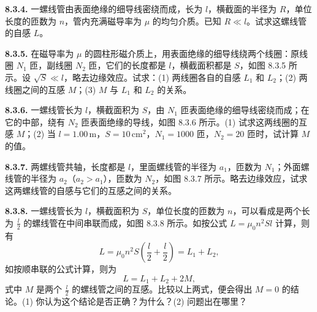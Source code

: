 \vfill
\newpage

\textbf{8.3.4.} 一螺线管由表面绝缘的细导线密绕而成，长为 $l$，横截面的半径为 $R$，单位长度的匝数为 $n$，管内充满磁导率为 $\mu$ 的均匀介质。已知 $R \ll l$。试求这螺线管的自感 $L$。

\begin{center}
\end{center}

\vfill
\newpage

\textbf{8.3.5.} 在磁导率为 $\mu$ 的圆柱形磁介质上，用表面绝缘的细导线绕两个线圈：原线圈 $N_{1}$ 匝，副线圈 $N_{2}$ 匝，它们的长度都是 $l$，横截面积都是 $S$，如图 8.3.5 所示。设 $\sqrt{S} \ll l$，略去边缘效应。试求：(1) 两线圈各自的自感 $L_{1}$ 和 $L_{2}$；(2) 两线圈之间的互感 $M$；(3) $M$ 与 $L_{1}$ 和 $L_{2}$ 的关系。

\begin{center}
\end{center}

\vfill
\newpage

\textbf{8.3.6.} 一螺线管长为 $l$，横截面积为 $S$，由 $N_{1}$ 匝表面绝缘的细导线密绕而成；在它的中部，绕有 $N_{2}$ 匝表面绝缘的导线，如图 8.3.6 所示。(1) 试求这两线圈的互感 $M$；(2) 当 $l = 1.00\,\mathrm{m}$，$S = 10\,\mathrm{cm}^{2}$，$N_{1} = 1000$ 匝，$N_{2} = 20$ 匝时，试计算 $M$ 的值。

\begin{center}
\end{center}

\vfill
\newpage

\textbf{8.3.7.} 两螺线管共轴，长度都是 $l$，里面螺线管的半径为 $a_1$，匝数为 $N_1$；外面螺线管的半径为 $a_2$（$a_2 > a_1$），匝数为 $N_2$，如图 8.3.7 所示。略去边缘效应，试求这两螺线管的自感与它们的互感之间的关系。

\begin{center}
\end{center}

\vfill
\newpage

\textbf{8.3.8.} 一螺线管长为 $l$，横截面积为 $S$，单位长度的匝数为 $n$，可以看成是两个长为 $\displaystyle \frac{l}{2}$ 的螺线管在中间串联而成，如图 8.3.8 所示。如按公式 $L = \mu_0 n^2 S l$ 计算，则有
\[
L = \mu_{0} n^{2} S \left(\frac{l}{2} + \frac{l}{2}\right) = L_{1} + L_{2},
\]
如按顺串联的公式计算，则为
\[
L = L_{1} + L_{2} + 2M,
\]
式中 $M$ 是两个 $\displaystyle \frac{l}{2}$ 的螺线管之间的互感。比较以上两式，便会得出 $M = 0$ 的结论。(1) 你认为这个结论是否正确？为什么？(2) 问题出在哪里？

